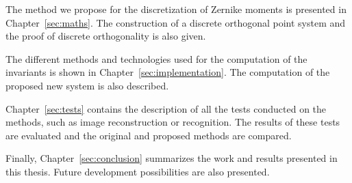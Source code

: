 The method we propose for the discretization of Zernike moments is presented in Chapter~\ref{sec:maths}. The construction of a discrete orthogonal point system and the proof of discrete orthogonality is also given.

The different methods and technologies used for the computation of the invariants is shown in Chapter~\ref{sec:implementation}. The computation of the proposed new system is also described.

Chapter~\ref{sec:tests} contains the description of all the tests conducted on the methods, such as image reconstruction or recognition. The results of these tests are evaluated and the original and proposed methods are compared.

Finally, Chapter~\ref{sec:conclusion} summarizes the work and results presented in this thesis. Future development possibilities are also presented.